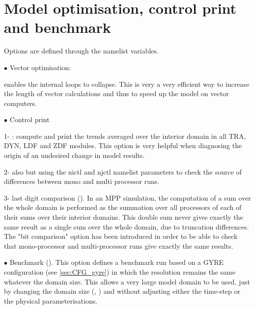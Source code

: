 \documentclass[../main/NEMO_manual]{subfiles}
\begin{document}
\section{Model optimisation, control print and benchmark}
\label{sec:MISC_opt}


Options are defined through the   namelist variables.

$\bullet$ Vector optimisation:

 enables the internal loops to collapse.
This is very a very efficient way to increase the length of vector calculations and thus
to speed up the model on vector computers.
 
 
 
$\bullet$ Control print %

1- : compute and print the trends averaged over the interior domain in all TRA, DYN, LDF and
ZDF modules.
This option is very helpful when diagnosing the origin of an undesired change in model results. 

2- also  but using the nictl and njctl namelist parameters to check the source of differences between
mono and multi processor runs.

3- last digit comparison ().
In an MPP simulation, the computation of a sum over the whole domain is performed as the summation over
all processors of each of their sums over their interior domains.
This double sum never gives exactly the same result as a single sum over the whole domain,
due to truncation differences.
The "bit comparison" option has been introduced in order to be able to check that
mono-processor and multi-processor runs give exactly the same results.

$\bullet$  Benchmark ().
This option defines a benchmark run based on a GYRE configuration (see \autoref{sec:CFG_gyre}) in which
the resolution remains the same whatever the domain size.
This allows a very large model domain to be used, just by changing the domain size (, ) and
without adjusting either the time-step or the physical parameterisations. 

\biblio
\end{document}
